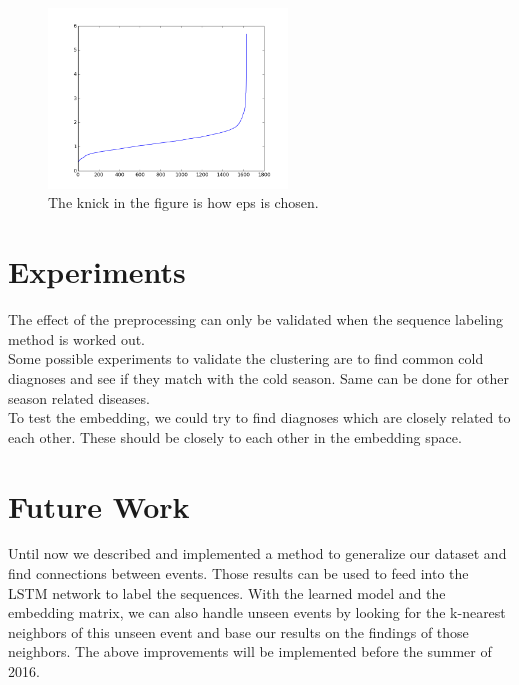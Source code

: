 \documentclass[journal]{IEEETemplate/IEEEtran}
\begin{document}
\begin{figure}[H]
\centering
\includegraphics[width=2.5in]{../Figures/eps.png}
\caption{The knick in the figure is how eps is chosen.}
\label{fig:word2vec}
\end{figure}

\section{Experiments}
The effect of the preprocessing can only be validated when the sequence labeling method is worked out. \\
Some possible experiments to validate the clustering are to find common cold diagnoses and see if they match with the cold season. Same can be done for other season related diseases. \\
To test the embedding, we could try to find diagnoses which are closely related to each other. These should be closely to each other in the embedding space.

\section{Future Work}
Until now we described and implemented a method to generalize our dataset and find connections between events. Those results can be used to feed into the LSTM network to label the sequences. With the learned model and the embedding matrix, we can also handle unseen events by looking for the k-nearest neighbors of this unseen event and base our results on the findings of those neighbors. The above improvements will be implemented before the summer of 2016.
\end{document}
